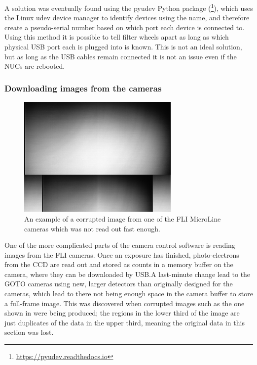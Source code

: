 \begin{colsection}
\begin{colsection}
A solution was eventually found using the pyudev Python package (\footnote{\url{https://pyudev.readthedocs.io}}), which uses the Linux udev device manager to identify devices using the  name, and therefore create a pseudo-serial number based on which port each device is connected to. Using this method it is possible to tell filter wheels apart as long as which physical USB port each is plugged into is known. This is not an ideal solution, but as long as the USB cables remain connected it is not an issue even if the NUCs are rebooted.

\subsubsection{Downloading images from the cameras}

\begin{figure}[t]
    \begin{center}
        \includegraphics[width=0.7\textwidth]{images/cam_readout.png}
    \end{center}
    \caption[A corrupted image which was not read out fast enough]{
        An example of a corrupted image from one of the FLI MicroLine cameras which was not read out fast enough.
    }\label{fig:cam_readout}
\end{figure}

One of the more complicated parts of the camera control software is reading images from the FLI cameras. Once an exposure has finished, photo-electrons from the CCD are read out and stored as counts in a memory buffer on the camera, where they can be downloaded by USB.\@ A last-minute change lead to the GOTO cameras using new, larger detectors than originally designed for the cameras, which lead to there not being enough space in the camera buffer to store a full-frame image. This was discovered when corrupted images such as the one shown in  were being produced; the regions in the lower third of the image are just duplicates of the data in the upper third, meaning the original data in this section was lost.


\end{colsection}
\end{colsection}
